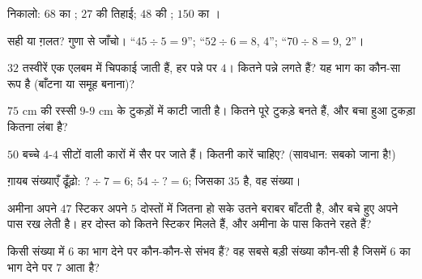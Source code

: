 \begin{exercise}[$\star$]\label{exo:g3:division:4}
निकालो: $68$ का ; $27$ की तिहाई; $48$ की ;
$150$ का ।
\end{exercise}

\begin{exercise}[$\star$]\label{exo:g3:division:5}
सही या ग़लत? गुणा से जाँचो।
``$45 \div 5 = 9$''; \quad ``$52 \div 6 = 8$,  $4$'';
\quad ``$70 \div 8 = 9$,  $2$''।
\end{exercise}

\begin{exercise}[$\star$]\label{exo:g3:division:6}
$32$ तस्वीरें एक एलबम में चिपकाई जाती हैं, हर पन्ने पर $4$। कितने
पन्ने लगते हैं? यह भाग का कौन-सा रूप है (बाँटना या समूह बनाना)?
\end{exercise}

\begin{exercise}[$\star$]\label{exo:g3:division:7}
$75$ cm की रस्सी $9$-$9$ cm के टुकड़ों में काटी जाती है। कितने
पूरे टुकड़े बनते हैं, और बचा हुआ टुकड़ा कितना लंबा है?
\end{exercise}

\begin{exercise}[$\star$]\label{exo:g3:division:8}
$50$ बच्चे $4$-$4$ सीटों वाली कारों में सैर पर जाते हैं। कितनी
कारें चाहिए? (सावधान: सबको जाना है!)
\end{exercise}

\begin{exercise}[$\star$]\label{exo:g3:division:9}
ग़ायब संख्याएँ ढूँढ़ो: $? \div 7 = 6$; \quad
$54 \div ? = 6$; \quad जिसका  $35$ है, वह संख्या।
\end{exercise}

\begin{exercise}[$\star\star$]\label{exo:g3:division:10}
अमीना अपने $47$ स्टिकर अपने $5$ दोस्तों में जितना हो सके उतने
बराबर बाँटती है, और बचे हुए अपने पास रख लेती है। हर दोस्त को
कितने स्टिकर मिलते हैं, और अमीना के पास कितने रहते हैं?
\end{exercise}

\begin{exercise}[$\star\star$]\label{exo:g3:division:11}
किसी संख्या में $6$ का भाग देने पर कौन-कौन-से
 संभव हैं? वह सबसे बड़ी संख्या कौन-सी है जिसमें $6$ का भाग
देने पर  $7$ आता है?
\end{exercise}
